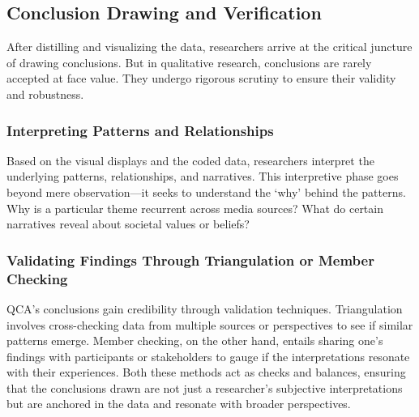 \documentclass[
  b5paper]{book}
\begin{document}
\hypertarget{conclusion-drawing-and-verification}{%
\subsection*{Conclusion Drawing and Verification}\label{conclusion-drawing-and-verification}}

After distilling and visualizing the data, researchers arrive at the critical juncture of drawing conclusions. But in qualitative research, conclusions are rarely accepted at face value. They undergo rigorous scrutiny to ensure their validity and robustness.

\hypertarget{interpreting-patterns-and-relationships}{%
\subsubsection*{Interpreting Patterns and Relationships}\label{interpreting-patterns-and-relationships}}

Based on the visual displays and the coded data, researchers interpret the underlying patterns, relationships, and narratives. This interpretive phase goes beyond mere observation---it seeks to understand the `why' behind the patterns. Why is a particular theme recurrent across media sources? What do certain narratives reveal about societal values or beliefs?

\hypertarget{validating-findings-through-triangulation-or-member-checking}{%
\subsubsection*{Validating Findings Through Triangulation or Member Checking}\label{validating-findings-through-triangulation-or-member-checking}}

QCA's conclusions gain credibility through validation techniques. Triangulation involves cross-checking data from multiple sources or perspectives to see if similar patterns emerge. Member checking, on the other hand, entails sharing one's findings with participants or stakeholders to gauge if the interpretations resonate with their experiences. Both these methods act as checks and balances, ensuring that the conclusions drawn are not just a researcher's subjective interpretations but are anchored in the data and resonate with broader perspectives.
\end{document}
